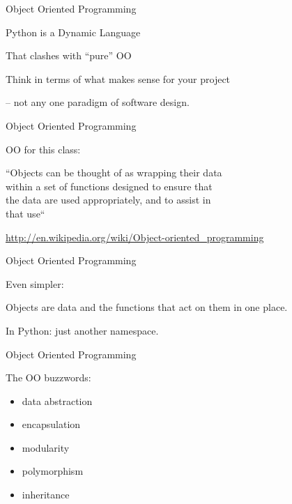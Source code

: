 \documentclass{beamer}
\begin{document}
\begin{frame}[fragile]{Object Oriented Programming}

\vfill
 {\LARGE Python is a Dynamic Language}

\vfill
{\Large That clashes with ``pure'' OO}

\vfill
{\Large Think in terms of what makes sense for your project

 -- not any one paradigm of software design.
}
\end{frame} 

\begin{frame}[fragile]{Object Oriented Programming}

\vfill
 {\LARGE OO for this class:}

\vfill
{\Large 
``Objects can be thought of as wrapping their data \\[.03in]
within a set of functions designed to ensure that \\[.03in]
the data are used appropriately, and to assist in \\[.03in]
that use``
}

\vfill
{\small
\url{http://en.wikipedia.org/wiki/Object-oriented_programming}
}

\end{frame} 

\begin{frame}[fragile]{Object Oriented Programming}

\vfill
{\LARGE Even simpler:}

\vfill
{\Large 
Objects are data and the functions that act on them in one place.
}

\vfill
{\Large 
In Python: just another namespace.
}
\end{frame} 

\begin{frame}[fragile]{Object Oriented Programming}

\vfill
{\LARGE The OO buzzwords:

\vfill
\begin{itemize}
  \item data abstraction
  \item encapsulation
  \item modularity
  \item polymorphism
  \item inheritance
\end{itemize}
}
\end{frame} 
\end{document}
